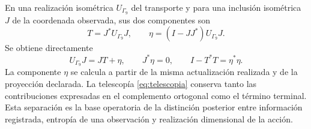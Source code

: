 En una realización isométrica \(U_{\Gamma_9}\) del transporte y para
una inclusión isométrica \(J\) de la coordenada observada, sus dos
componentes son
\[
 T=J^*U_{\Gamma_9}J,\qquad
 \eta=(I-JJ^*)U_{\Gamma_9}J.
\]
Se obtiene directamente
\[
 U_{\Gamma_9}J=JT+\eta,\qquad J^*\eta=0,\qquad
 I-T^*T=\eta^*\eta.
\]
La componente \(\eta\) se calcula a partir de la misma actualización
realizada y de la proyección declarada. La telescopía
\eqref{eq:telescopia} conserva tanto las contribuciones expresadas en el
complemento ortogonal como el término terminal. Esta separación es la
base operatoria de la distinción posterior entre información registrada,
entropía de una observación y realización dimensional de la acción.
